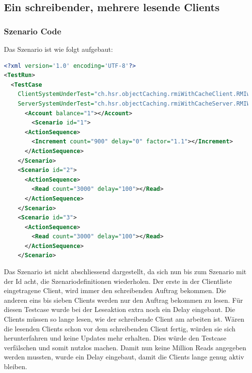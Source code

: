 \subsection{Ein schreibender, mehrere lesende Clients}
\subsubsection{Szenario Code}
Das Szenario ist wie folgt aufgebaut:
\begin{lstlisting}[language=XML, breaklines=true]
<?xml version='1.0' encoding='UTF-8'?>
<TestRun>
  <TestCase
    ClientSystemUnderTest="ch.hsr.objectCaching.rmiWithCacheClient.RMIwithCacheClientSystem"
    ServerSystemUnderTest="ch.hsr.objectCaching.rmiWithCacheServer.RMIWithCacheServerSystem">
      <Account balance="1"></Account>
        <Scenario id="1">
	  <ActionSequence>
	    <Increment count="900" delay="0" factor="1.1"></Increment>
	  </ActionSequence>
	</Scenario>
	<Scenario id="2">
	  <ActionSequence>
	    <Read count="3000" delay="100"></Read>
	  </ActionSequence>
	</Scenario>
	<Scenario id="3">
	  <ActionSequence>
	    <Read count="3000" delay="100"></Read>
	  </ActionSequence>
	</Scenario>
\end{lstlisting}

Das Szenario ist nicht abschliessend dargestellt, da sich nun bis zum Szenario mit der Id acht, die Szenariodefinitionen wiederholen. Der erste in der Clientliste eingetragene Client, wird immer den schreibenden Auftrag bekommen. Die anderen eins bis sieben Clients werden nur den Auftrag bekommen zu lesen. \newline
Für diesen Testcase wurde bei der Leseaktion extra noch ein Delay eingebaut. Die Clients müssen so lange lesen, wie der schreibende Client am arbeiten ist. Wären die lesenden Clients schon vor dem schreibenden Client fertig, würden sie sich herunterfahren und keine Updates mehr erhalten. Dies würde den Testcase verfälschen und somit nutzlos machen. Damit nun keine Million Reads angegeben werden mussten, wurde ein Delay eingebaut, damit die Clients lange genug aktiv bleiben. 
